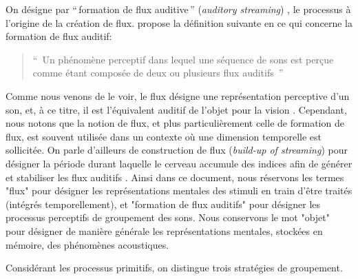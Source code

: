 On désigne par ``\,formation de flux auditive\,'' (\emph{auditory streaming}) , le processus à l'origine de la création de flux. \citep{winkler2009modeling} propose la définition suivante en ce qui concerne la formation de flux auditif:
\begin{quote}
``\, Un phénomène perceptif dans lequel une séquence de sons est perçue comme étant composée de deux ou plusieurs flux auditifs \,''
\end{quote}

Comme nous venons de le voir, le flux désigne une représentation perceptive d'un son, et, à ce titre, il est l'équivalent auditif de l'objet pour la vision \citep[p. 11]{bregman1994auditory}. Cependant, nous notons que la notion de flux, et plus particulièrement celle de formation de flux, est souvent utilisée dans un contexte où une dimension temporelle est sollicitée. On parle d'ailleurs de construction de flux  (\emph{build-up of streaming}) pour désigner la période durant laquelle le cerveau accumule des indices afin de générer et stabiliser les flux auditifs  \citep{cusack2004effects,snyder2007toward}. Ainsi dans ce document, nous réservons les termes "flux" pour désigner les représentations mentales des stimuli en train d'être traités (intégrés temporellement), et "formation de flux auditifs" pour désigner les processus perceptifs de groupement des sons. Nous conservons le mot "objet" pour désigner de manière générale les représentations mentales, stockées en mémoire, des phénomènes acoustiques.

Considérant les processus primitifs, on distingue trois stratégies de groupement.

